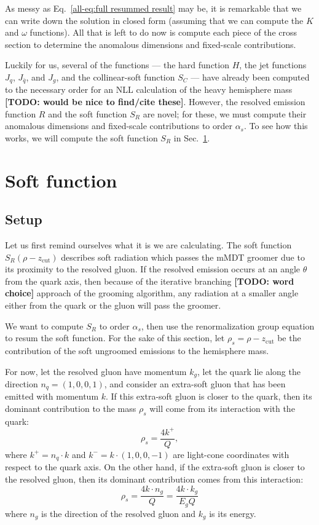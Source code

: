 \documentclass[../thesis.tex]{subfiles}
\providecommand{\zcut}{z_\mathrm{{cut}}}
\begin{document}
	As messy as Eq.~\ref{all-eq:full resummed result} may be, it is remarkable that we can write down the solution in closed form (assuming that we can compute the $K$ and $\omega$ functions). All that is left to do now is compute each piece of the cross section to determine the anomalous dimensions and fixed-scale contributions.

	Luckily for us, several of the functions --- the hard function $H$, the jet functions $J_q$, $J_{\bar q}$, and $J_g$, and the collinear-soft function $S_C$ --- have already been computed to the necessary order for an NLL calculation of the heavy hemisphere mass {\color{red}\textbf{[TODO: would be nice to find/cite these]}}. However, the resolved emission function $R$ and the soft function $S_R$ are novel; for these, we must compute their anomalous dimensions and fixed-scale contributions to order $\alpha_s$. To see how this works, we will compute the soft function $S_R$ in Sec.~\ref{all-sec:soft function calculation}.
	

\section{Soft function}\label{all-sec:soft function calculation}
\subsection{Setup}
	Let us first remind ourselves what it is we are calculating. The soft function $S_R(\rho - \zcut)$ describes soft radiation which passes the mMDT groomer due to its proximity to the resolved gluon. If the resolved emission occurs at an angle $\theta$ from the quark axis, then because of the iterative branching {\color{red}\textbf{[TODO: word choice]}} approach of the grooming algorithm, any radiation at a smaller angle either from the quark or the gluon will pass the groomer.

	We want to compute $S_R$ to order $\alpha_s$, then use the renormalization group equation to resum the soft function. For the sake of this section, let $\rho_s = \rho - \zcut$ be the contribution of the soft ungroomed emissions to the hemisphere mass.

	For now, let the resolved gluon have momentum $k_g$, let the quark lie along the direction $n_q = (1, 0, 0, 1)$, and consider an extra-soft gluon that has been emitted with momentum $k$. If this extra-soft gluon is closer to the quark, then its dominant contribution to the mass $\rho_s$ will come from its interaction with the quark:
	\begin{equation}
		\rho_s = \frac{4k^+}{Q},
	\end{equation}
	where $k^+ = n_q \cdot k$ and $k^- = k \cdot (1, 0, 0, -1)$ are light-cone coordinates with respect to the quark axis. On the other hand, if the extra-soft gluon is closer to the resolved gluon, then its dominant contribution comes from this interaction:
	\begin{equation}
		\rho_s = \frac{4 k \cdot n_g}{Q} = \frac{4 k \cdot k_g}{E_g Q}
	\end{equation}
	where $n_g$ is the direction of the resolved gluon and $k_g$ is its energy.
\end{document}
